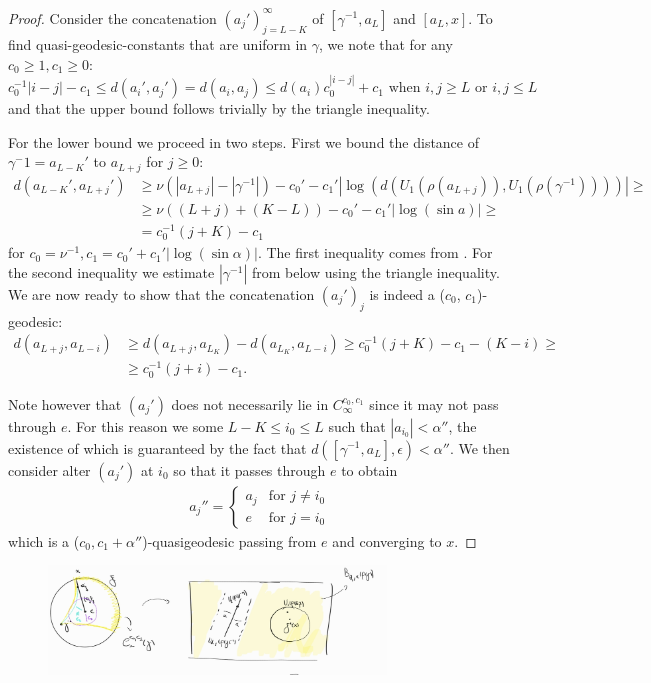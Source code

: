 \documentclass{report}
\begin{document}
\begin{proof}
    Consider the concatenation $(a_j')_{j=L-K}^\infty$ of $[\gamma^{-1},a_L]$ and $[a_L, x]$.
    To find quasi-geodesic-constants that are uniform in $\gamma$, we note that for any $c_0 \geq 1, c_1 \geq 0$:
    \[
        c_0^{-1} |i - j| - c_1 \leq d(a_i', a_j') = d(a_i, a_j) \leq d(a_i) c_0^ |i - j| + c_1 
        \text{ when } i,j \geq L \text{ or } i,j \leq L
    \]
    and that the upper bound follows trivially by the triangle inequality. 
    
    For the lower bound we proceed in two steps. 
    First we bound the distance of $\gamma^-1 = a_{L-K}'$ to $a_{L+j}$ for $j\geq 0$:
    \begin{align*}
        d(a_{L-K}', a_{L+j}') 
        &\geq \nu (|a_{L+j}| - |\gamma^{-1}|) - c_0' -c_1'|\log(d(U_1(\rho(a_{L+j})), U_1(\rho(\gamma^{-1}))))| \geq\\
        &\geq \nu((L+j) + (K-L)) - c_0' -c_1'|\log(\sin a)| \geq\\
        &= c_0^{-1} (j+K) - c_1
    \end{align*}
    for $c_0 = \nu^{-1}, c_1 = c_0' + c_1'|\log(\sin \alpha)|$.
    The first inequality comes from \cite[Lemma 3.9]{pozzetti_anosov_2023}. For the second inequality we estimate $|\gamma^{-1}|$ from below using the triangle inequality.
    We are now ready to show that the concatenation $(a_j')_j$ is indeed a ($c_0$, $c_1$)-geodesic:
    \begin{align*}
        d(a_{L+j}, a_{L-i}) &\geq d(a_{L+j},a_{L_K}) - d(a_{L_K}, a_{L-i}) \geq
        c_0^{-1} (j+K) - c_1 - (K - i) \geq\\
        &\geq c_0^{-1} (j+i) - c_1.
    \end{align*}

    Note however that $(a_j')$ does not necessarily lie in $C_\infty^{c_0, c_1}$ since it may not pass through $e$.
    For this reason we some $L - K \leq i_0\leq L$ such that $|a_{i_0}| < \alpha''$, the existence of which is guaranteed by the fact that $d([\gamma^{-1}, a_L], \epsilon) < \alpha''$.
    We then consider alter $(a_j')$ at $i_0$ so that it passes through $e$ to obtain 
    \begin{align*}
        a_j''=
        \begin{cases}
            a_j & \text{for } j\neq i_0 \\
            e & \text{for } j = i_0
        \end{cases}      
    \end{align*}
    which is a ($c_0, c_1 + \alpha''$)-quasigeodesic passing from $e$ and converging to $x$.
\end{proof}
\begin{figure}[h]
    \centering
    \includegraphics[width=0.8\textwidth]{cone.jpg}
\end{figure}
\end{document}
